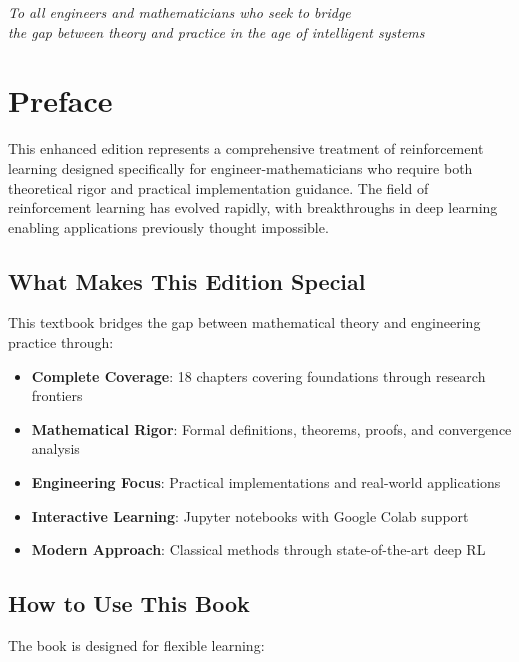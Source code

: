 \documentclass[11pt,twoside,openright]{book}
\begin{document}
\newpage
\thispagestyle{empty}
\vspace*{\fill}
\begin{center}
\textit{To all engineers and mathematicians who seek to bridge\\
the gap between theory and practice in the age of intelligent systems}
\end{center}
\vspace*{\fill}

\chapter*{Preface}

This enhanced edition represents a comprehensive treatment of reinforcement learning designed specifically for engineer-mathematicians who require both theoretical rigor and practical implementation guidance. The field of reinforcement learning has evolved rapidly, with breakthroughs in deep learning enabling applications previously thought impossible.

\section*{What Makes This Edition Special}

This textbook bridges the gap between mathematical theory and engineering practice through:

\begin{itemize}
\item \textbf{Complete Coverage}: 18 chapters covering foundations through research frontiers
\item \textbf{Mathematical Rigor}: Formal definitions, theorems, proofs, and convergence analysis
\item \textbf{Engineering Focus}: Practical implementations and real-world applications
\item \textbf{Interactive Learning}: Jupyter notebooks with Google Colab support
\item \textbf{Modern Approach}: Classical methods through state-of-the-art deep RL
\end{itemize}

\section*{How to Use This Book}

The book is designed for flexible learning:
\end{document}
